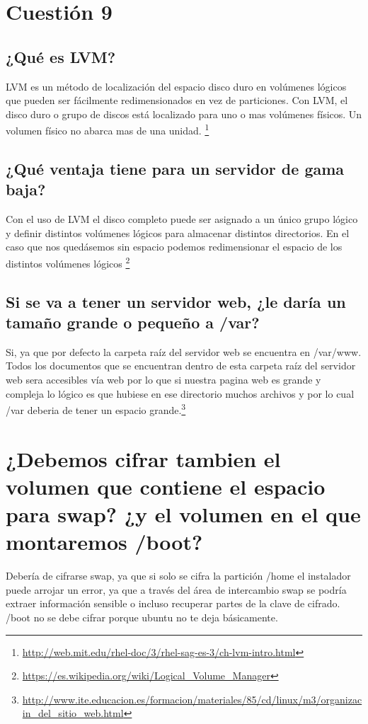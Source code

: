 \section{Cuestión 9}
\subsection{¿Qué es LVM?}
LVM es un método de localización del espacio disco duro en volúmenes lógicos que pueden ser fácilmente redimensionados en vez de particiones. Con LVM, el disco duro o grupo de discos está localizado para uno o mas volúmenes físicos. Un volumen físico no abarca mas de una unidad.
\footnote{\url{http://web.mit.edu/rhel-doc/3/rhel-sag-es-3/ch-lvm-intro.html}}
\subsection{¿Qué ventaja tiene para un servidor de gama baja?}
Con el uso de LVM el disco completo puede ser asignado a un único grupo lógico y definir distintos volúmenes lógicos para almacenar distintos directorios. En el caso que nos quedásemos sin espacio podemos redimensionar el espacio de los distintos volúmenes lógicos
\footnote{\url{https://es.wikipedia.org/wiki/Logical_Volume_Manager}}
\subsection{Si se va a tener un servidor web, ¿le daría un tamaño grande o pequeño a /var?}
Si, ya que por defecto la carpeta raíz del servidor web se encuentra en /var/www. Todos los documentos que se encuentran dentro de esta carpeta raíz del servidor web sera accesibles vía web por lo que si nuestra pagina web es grande y compleja lo lógico es que hubiese en ese directorio muchos archivos y por lo cual /var deberia de tener un espacio grande.\footnote{\url{http://www.ite.educacion.es/formacion/materiales/85/cd/linux/m3/organizacin_del_sitio_web.html}}
\newpage
\section{¿Debemos cifrar tambien el volumen que contiene el espacio para swap? ¿y el volumen en el que montaremos /boot?}
Debería de cifrarse swap, ya que si solo se cifra la partición /home el instalador puede arrojar un error, ya que a través del área de intercambio swap se podría extraer información sensible o incluso recuperar partes de la clave de cifrado.
/boot no se debe cifrar porque ubuntu no te deja básicamente. 
